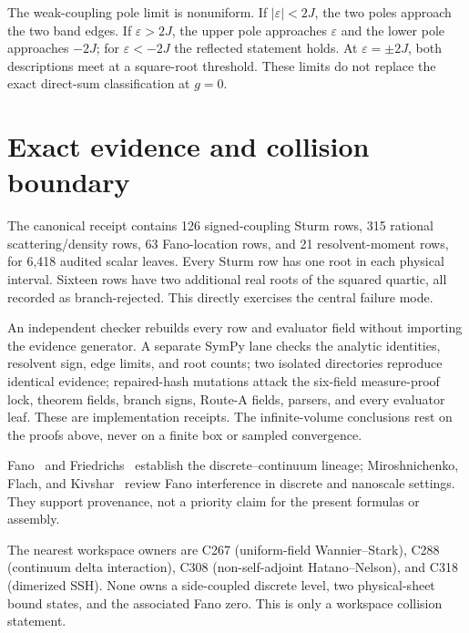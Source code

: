 \documentclass[9pt]{extarticle}
\begin{document}
The weak-coupling pole limit is nonuniform.  If $|\varepsilon|<2J$, the two
poles approach the two band edges.  If $\varepsilon>2J$, the upper pole
approaches $\varepsilon$ and the lower pole approaches $-2J$; for
$\varepsilon<-2J$ the reflected statement holds.  At
$\varepsilon=\pm2J$, both descriptions meet at a square-root threshold.
These limits do not replace the exact direct-sum classification at $g=0$.

\section{Exact evidence and collision boundary}
The canonical receipt contains 126 signed-coupling Sturm rows, 315 rational
scattering/density rows, 63 Fano-location rows, and 21 resolvent-moment rows,
for 6,418 audited scalar leaves.  Every Sturm row has one root in each
physical interval.  Sixteen rows have two additional real roots of the
squared quartic, all recorded as branch-rejected.  This directly exercises
the central failure mode.

An independent checker rebuilds every row and evaluator field without
importing the evidence generator.  A separate SymPy lane checks the analytic
identities, resolvent sign, edge limits, and root counts; two isolated
directories reproduce identical evidence; repaired-hash mutations attack the
six-field measure-proof lock, theorem fields, branch signs, Route-A fields,
parsers, and every evaluator leaf.  These are implementation receipts.  The
infinite-volume conclusions rest on the proofs above, never on a finite box or
sampled convergence.

Fano~\cite{Fano1961} and Friedrichs~\cite{Friedrichs1948} establish the
discrete--continuum lineage; Miroshnichenko, Flach, and
Kivshar~\cite{Miroshnichenko2010} review Fano interference in discrete and
nanoscale settings.  They support provenance, not a priority claim for the
present formulas or assembly.

The nearest workspace owners are C267 (uniform-field Wannier--Stark), C288
(continuum delta interaction), C308 (non-self-adjoint Hatano--Nelson), and
C318 (dimerized SSH).  None owns a side-coupled discrete level, two
physical-sheet bound states, and the associated Fano zero.  This is only a
workspace collision statement.
\end{document}
